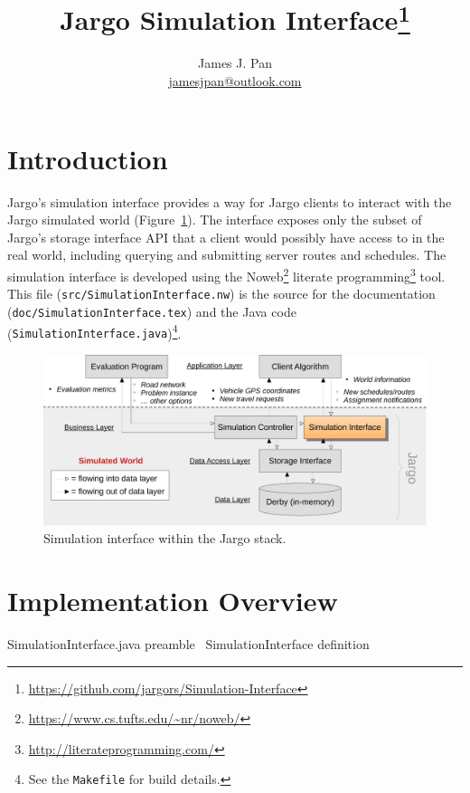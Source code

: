 \documentclass{article}
\title{Jargo Simulation Interface\footnote{\url{https://github.com/jargors/Simulation-Interface}}}
\author{James J. Pan\\
  \small{\href{mailto:jamesjpan@outlook.com}{jamesjpan@outlook.com}}
}
\def\nwendcode{\endtrivlist \endgroup}
\let\nwdocspar=\par
\begin{document}
\maketitle
\pagestyle{noweb}

\tableofcontents

\section{Introduction}
\label{sec:introduction}
Jargo's simulation interface provides a way for Jargo clients to interact with
the Jargo simulated world (Figure~\ref{fig:interface-fig}). The interface
exposes only the subset of Jargo's storage interface API that a client would
possibly have access to in the real world, including querying and submitting
server routes and schedules.  The simulation interface is developed using the
Noweb\footnote{\url{https://www.cs.tufts.edu/~nr/noweb/}} literate
programming\footnote{\url{http://literateprogramming.com/}} tool.  This file
({\tt{}src/SimulationInterface.nw}) is the source for the documentation
({\tt{}doc/SimulationInterface.tex}) and the Java code
({\tt{}SimulationInterface.java})\footnote{See the {\tt{}Makefile} for build
details.}.

\begin{figure}[h]
\centering
\includegraphics[width=150mm]{src/fig/interface-fig}
\caption{Simulation interface within the Jargo stack.}
\label{fig:interface-fig}
\end{figure}

\section{Implementation Overview}
\label{sec:implementation-overview}
\endmoddef{}
  \LA{}SimulationInterface.java preamble~{\nwtagstyle{}}\RA{}
  \LA{}\code{}SimulationInterface\edoc{} definition~{\nwtagstyle{}}\RA{}
\nwendcode{}\nwdocspar
\end{document}
